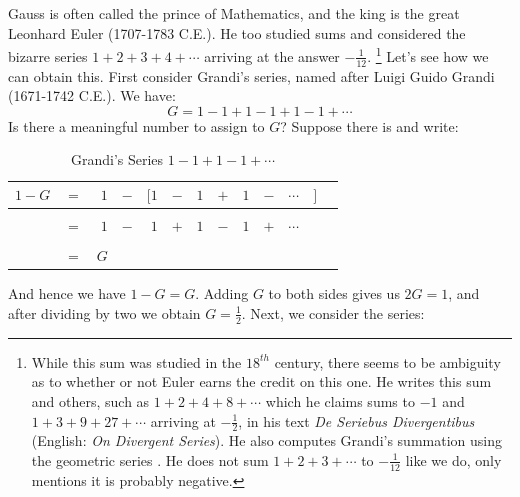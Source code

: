     \begin{example}
        \label{ex:Logic_Euler_Sum}%
        Gauss is often called the prince of Mathematics, and the king is the
        great Leonhard Euler (1707-1783 C.E.). He too
        studied sums and considered the bizarre series $1+2+3+4+\cdots$ arriving
        at the answer $\minus\frac{1}{12}$.%
        \footnote{%
            While this sum was studied in the $18^{th}$ century, there seems to
            be ambiguity as to whether or not Euler earns the credit on this
            one. He writes this sum and others, such as $1+2+4+8+\cdots$ which
            he claims sums to $\minus{1}$ and $1+3+9+27+\cdots$ arriving at
            $\minus\frac{1}{2}$, in his text \textit{De Seriebus Divergentibus}
            (English: \textit{On Divergent Series}). He also computes Grandi's
            summation using the geometric series
            \cite[p.~206-208]{euler2012seriebus}. He does not sum $1+2+3+\cdots$
            to $\minus\frac{1}{12}$ like we do, only mentions it is probably
            negative.
        }
        Let's see how we can obtain this. First consider Grandi's
        series, named after Luigi Guido Grandi%
         (1671-1742 C.E.). We have:
        \begin{equation}
            G=1-1+1-1+1-1+\cdots
        \end{equation}
        Is there a meaningful number to assign to $G$? Suppose there is and
        write:
        \begin{table}[H]
            \centering
            \captionsetup{type=table}
            \begin{tabular}{rrrrrrrrrrrrr}
                $1-G$&$=$&$1$&$-$&$\Big[$$1$&$-$&$1$&$+$&$1$&$-$&$\cdots$
                    &$\Big]$\\[1ex]
                \hline\\
                    &$=$&$1$&$-$&$1$&$+$&$1$&$-$&$1$&$+$&$\cdots$\\[1ex]
                \hline\\
                &$=$&$G$
            \end{tabular}
            \caption{Grandi's Series $1-1+1-1+\cdots$}
        \end{table}
        \begin{minipage}[c]{0.58\textwidth}
            And hence we have $1-G=G$. Adding $G$ to both sides gives us $2G=1$,
            and after dividing by two we obtain $G=\frac{1}{2}$.
            Next, we consider the series:

\end{minipage}
\end{example}
